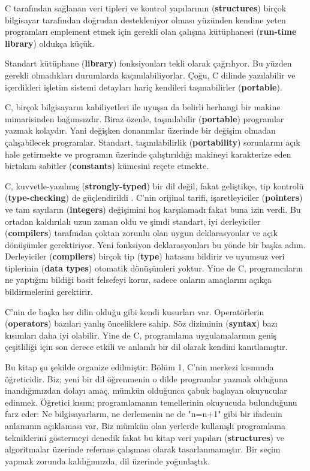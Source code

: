 \documentclass[a4paper,12pt,oneside]{book}
\begin{document}
\par C tarafından sağlanan veri tipleri ve kontrol yapılarının (\textbf{structures}) birçok bilgisayar tarafından doğrudan destekleniyor olması yüzünden kendine yeten programları emplement etmek için gerekli olan çalışma kütüphanesi (\textbf{run-time library}) oldukça küçük. \pagebreak

\noindent \thispagestyle{introduction} Standart kütüphane (\textbf{library}) fonksiyonları  tekli olarak çağrılıyor. Bu yüzden gerekli olmadıkları durumlarda kaçınılabiliyorlar. Çoğu, C dilinde yazılabilir ve içerdikleri işletim sistemi detayları hariç kendileri taşınabilirler (\textbf{portable}).
\par C, birçok bilgisayarın kabiliyetleri ile uyuşsa da belirli herhangi bir makine mimarisinden bağımsızdır. Biraz özenle, taşınılabilir (\textbf{portable}) programlar yazmak kolaydır. Yani değişken donanımlar üzerinde bir değişim olmadan çalışabilecek programlar. Standart, taşınılabilirlik (\textbf{portability}) sorunlarını açık hale getirmekte ve programın üzerinde çalıştırıldığı makineyi karakterize eden birtakım sabitler (\textbf{constants}) kümesini reçete etmekte.
\par C, kuvvetle-yazılmış (\textbf{strongly-typed}) bir dil değil, fakat geliştikçe, tip kontrolü (\textbf{type-checking}) de güçlendirildi . C'nin orijinal tarifi, işaretleyiciler (\textbf{pointers}) ve tam sayıların (\textbf{integers}) değişimini hoş karşılamadı fakat buna izin verdi. Bu ortadan kaldırılalı uzun zaman oldu ve şimdi standart, iyi derleyiciler (\textbf{compilers}) tarafından çoktan zorunlu olan uygun deklarasyonlar ve açık dönüşümler gerektiriyor. Yeni fonksiyon  deklarasyonları bu yönde bir başka adım. Derleyiciler (\textbf{compilers}) birçok tip (\textbf{type}) hatasını bildirir ve uyumsuz veri tiplerinin (\textbf{data types}) otomatik dönüşümleri yoktur. Yine de C, programcıların ne yaptığını bildiği basit felsefeyi korur, sadece onların amaçlarını açıkça bildirmelerini gerektirir.
\par C'nin de başka her dilin olduğu gibi kendi kusurları var. Operatörlerin (\textbf{operators}) bazıları yanlış önceliklere sahip. Söz diziminin (\textbf{syntax}) bazı kısımları daha iyi olabilir. Yine de C, programlama uygulamalarının geniş çeşitliliği için son derece etkili ve anlamlı bir dil olarak kendini kanıtlamıştır.
\par Bu kitap şu şekilde organize edilmiştir: Bölüm 1, C'nin merkezi kısmında öğreticidir. Biz; yeni bir dil öğrenmenin o dilde programlar yazmak olduğuna inandığımızdan dolayı amaç, mümkün olduğunca çabuk başlayan okuyucular edinmek. Öğretici kısım; programlamanın temellerinin okuyucuda bulunduğunu farz eder: Ne bilgisayarların, ne derlemenin ne de "n=n+1" gibi bir ifadenin anlamının açıklaması var. Biz mümkün olan yerlerde kullanışlı programlama tekniklerini göstermeyi denedik fakat bu kitap veri yapıları (\textbf{structures}) ve algoritmalar üzerinde referans çalışması olarak tasarlanmamıştır. Bir seçim yapmak zorunda kaldığımızda, dil üzerinde yoğunlaştık.
\end{document}
